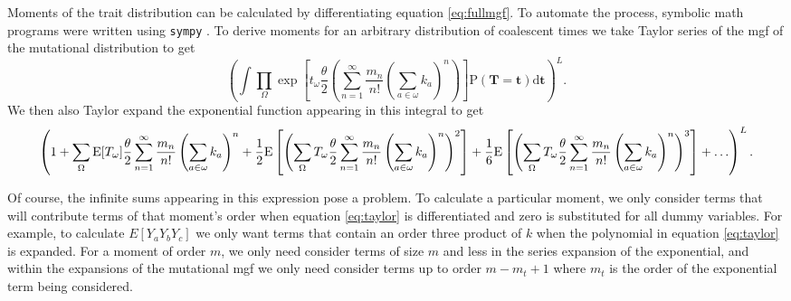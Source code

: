 Moments of the trait distribution can be calculated by differentiating equation
\eqref{eq:fullmgf}. To automate the process, symbolic math programs were written
using \texttt{sympy} \citep{sympy}. To derive moments for an arbitrary
distribution of coalescent times we take Taylor series of the mgf of the
mutational distribution to get
\begin{equation}
  \left(\int \prod_{\Omega} \exp\left[ t_{\omega} \frac{\theta}{2} \left(
    \sum_{n=1}^{\infty} \frac{m_n}{n!} \left( \sum_{a \in \omega} k_a \right)^n
    \right) \right] \mathrm{P}(\mathbf{T} = \mathbf{t}) \mathrm{d}\mathbf{t} \right)^L.
\end{equation}
We then also Taylor expand the exponential function appearing in this integral to get
\begin{equation} \label{eq:taylor}
  \tiny
  \left( 1 + \sum_{\Omega} \mathrm{E}[T_\omega] \frac{\theta}{2}
  \sum_{n=1}^{\infty} \frac{m_n}{n!} \left( \sum_{a \in \omega} k_a \right)^n +
  \frac{1}{2} \mathrm{E} \left[ \left( \sum_{\Omega} T_\omega \frac{\theta}{2}
    \sum_{n=1}^{\infty} \frac{m_n}{n!} \left( \sum_{a \in \omega} k_a
    \right)^n\right)^2 \right] + \frac{1}{6} \mathrm{E}\left[\left(
    \sum_{\Omega} T_\omega \frac{\theta}{2} \sum_{n=1}^{\infty} \frac{m_n}{n!}
    \left( \sum_{a \in \omega} k_a \right)^n \right)^3\right] + \ldots \right)^L.
\end{equation}

Of course, the infinite sums appearing in this expression pose a problem. To
calculate a particular moment, we only consider terms that will contribute terms
of that moment's order when equation \eqref{eq:taylor} is differentiated and
zero is substituted for all dummy variables. For example, to calculate
$E[Y_aY_bY_c]$ we only want terms that contain an order three product of $k$
when the polynomial in equation \eqref{eq:taylor} is expanded. For a moment of
order $m$, we only need consider terms of size $m$ and less in the series
expansion of the exponential, and within the expansions of the mutational mgf we
only need consider terms up to order $m-m_t+1$ where $m_t$ is the order of the
exponential term being considered.
